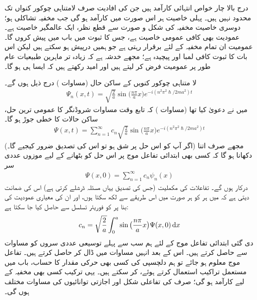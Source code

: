 درج بالا چار خواص انتہائی  کارآمد  ہیں جن کی افادیت  صرف لامتناہی چوکور کنواں تک محدود نہیں ہیں۔ پہلی خاصیت  ہر اس صورت میں کارآمد ہو گی  جب مخفیہ تشاکلی ہو؛ دوسری خاصیت  مخفیہ کی شکل و صورت سے قطع نظر، ایک عالمگیر خاصیت ہے۔ عمودیت بھی کافی عمومی خاصیت ہے، جس کا ثبوت میں باب  میں پیش کروں گا۔ عمومیت ان تمام مخفیہ کے لئے  برقرار رہتی ہے  جو ہمیں درپیش ہو سکتے ہیں   لیکن اس بات  کا ثبوت کافی لمبا اور پیچیدہ ہے؛  مجھے خدشہ ہے کہ زیادہ تر ماہرین طبیعیات عام طور پر عمومیت فرض کر لیتے ہیں اور امید رکھتے ہیں کہ ایسا ہی ہو گا۔

 لا متناہی چوکور کنویں کے ساکن حال (مساوات ) درج ذیل ہوں گے۔ 
 \begin{align}
\Psi_{n}(x,t)=\sqrt{\frac{2}{a}}\sin\big(\frac{n\pi}{a}x\big)e^{-i(n^{2}\pi^{2}\hslash/2ma^{2})t}
\end{align}
 میں نے دعویٰ کیا  تھا (مساوات ) کہ تابع وقت مساوات شروڈنگر کا عمومی ترین حل، ساکن حالات کا خطی جوڑ ہو گا۔
\begin{align}\label{مساوات_شروڈنگر_ساکن_حالات_کا_مجموعہ}
\Psi(x,t)=\sum_{n=1}^{\infty}c_n\sqrt{\frac{2}{a}}\sin\big(\frac{n\pi}{a}x\big)e^{-i(n^{2}\pi^{2}\hslash/2ma^{2})t}
\end{align} 
 (اگر آپ کو اس حل پر شق ہو تو اس کی تصدیق ضرور کیجیے گا۔) مجھے صرف اتنا دکھانا ہو گا کہ کسی بھی ابتدائی تفاعل موج  پر اس حل کو بٹھانے کے لیے موزوں عددی سر 
\begin{align*}
\Psi(x,0)=\sum_{n=1}^{\infty}c_{n}\psi_{n}(x)
\end{align*}
 درکار ہوں گے۔ تفاعلات  کی مکملیت (جس کی تصدیق یہاں مسئلہ ڈرشلے کرتی ہے) اس کی ضمانت دیتی ہے کہ میں ہر  کو ہر صورت میں اس طریقے سے لکھ سکتا ہوں، اور ان کی معیاری عمودیت کی بنا  پر  کو فوریئر تسلسل سے حاصل کیا جا سکتا ہے: 
\begin{align}\label{مساوات_شروڈنگر_عددی_سروں}
c_{n}=\sqrt{\frac{2}{a}}\int_{0}^{a}\sin\big(\frac{n\pi}{a}x\big)\Psi(x,0)\dif{x}
\end{align}
 دی گئی ابتدائی تفاعل موج  کے لئے ہم سب سے پہلے  توسیعی  عددی سروں  کو مساوات  سے حاصل کرتے ہیں۔ اس کے بعد انہیں   مساوات  میں ڈال  کر   حاصل کرتے ہیں۔ تفاعل موج  معلوم ہو جائے تو ہم   دلچسپی کی کسی بھی حرکی مقدار کا حساب، باب  میں مستعمل تراکیب استعمال کرتے ہوئے، کر سکتے ہیں۔ یہی ترکیب کسی بھی مخفیہ کے لیے کارآمد ہو گی؛ صرف  کی تفاعلی  شکل  اور اجازتی توانائیوں کی مساوات   مختلف ہوں گی۔

